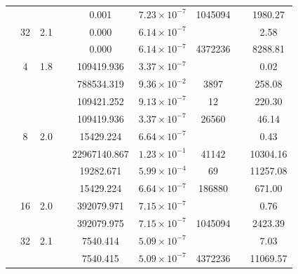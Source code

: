 \begin{table}[htbp]
\begin{tabular}{l S[table-format=3.0] S[table-format=4.1] l S[table-format=3.3] S[table-format=1.2e2] S[table-format=6.0] S[table-format=2.0] S[table-format=4.2]}
     &  &  &  & 0.001 & $7.23 \times 10^{-7}$ & 1045094 & {\text{---}} & 1980.27 \\
     & 32 & 2.1 &  & 0.000 & $6.14 \times 10^{-7}$ & {\text{---}} & {\text{---}} & 2.58 \\
     &  &  &  & 0.000 & $6.14 \times 10^{-7}$ & 4372236 & {\text{---}} & 8288.81 \\
    \midrule
     & 4 & 1.8 &  & 109419.936 & $3.37 \times 10^{-7}$ & {\text{---}} & {\text{---}} & 0.02 \\
     &  &  &  & 788534.319 & $9.36 \times 10^{-2}$ & 3897 & {\text{---}} & 258.08 \\
     &  &  &  & 109421.252 & $9.13 \times 10^{-7}$ & 12 & {\text{---}} & 220.30 \\
     &  &  &  & 109419.936 & $3.37 \times 10^{-7}$ & 26560 & {\text{---}} & 46.14 \\
     & 8 & 2.0 &  & 15429.224 & $6.64 \times 10^{-7}$ & {\text{---}} & {\text{---}} & 0.43 \\
     &  &  &  & 22967140.867 & $1.23 \times 10^{-1}$ & 41142 & {\text{---}} & 10304.16 \\
     &  &  &  & 19282.671 & $5.99 \times 10^{-4}$ & 69 & {\text{---}} & 11257.08 \\
     &  &  &  & 15429.224 & $6.64 \times 10^{-7}$ & 186880 & {\text{---}} & 671.00 \\
     & 16 & 2.0 &  & 392079.971 & $7.15 \times 10^{-7}$ & {\text{---}} & {\text{---}} & 0.76 \\
     &  &  &  & 392079.975 & $7.15 \times 10^{-7}$ & 1045094 & {\text{---}} & 2423.39 \\
     & 32 & 2.1 &  & 7540.414 & $5.09 \times 10^{-7}$ & {\text{---}} & {\text{---}} & 7.03 \\
     &  &  &  & 7540.415 & $5.09 \times 10^{-7}$ & 4372236 & {\text{---}} & 11069.57 \\
    \bottomrule
  \end{tabular}
\end{table}
